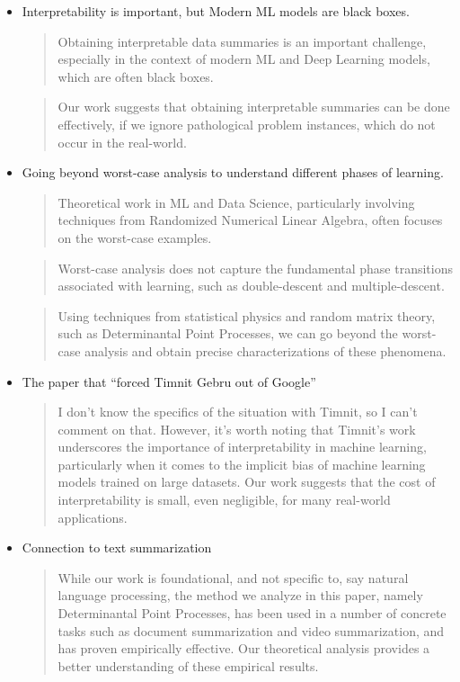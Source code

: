 \documentclass[11pt, oneside]{article}   	%
\begin{document}
\newpage
\begin{itemize}
\item Interpretability is important, but Modern ML models are
  black boxes.
  \begin{quote}
    Obtaining interpretable data summaries is an
    important challenge, especially in the context of modern ML and
    Deep Learning models, which are often black boxes.
  \end{quote}
  \begin{quote}
    Our work suggests that obtaining interpretable summaries can be
    done effectively, if we ignore pathological problem instances,
    which do not occur in the real-world.
  \end{quote}
\item Going beyond worst-case analysis to understand different phases
  of learning.
  \begin{quote}
Theoretical work in ML and Data Science, particularly involving
techniques from Randomized Numerical Linear Algebra, often focuses on
the worst-case examples.
\end{quote}
\begin{quote}
  Worst-case analysis does not capture the
fundamental phase transitions associated with learning, such as
double-descent and multiple-descent.
\end{quote}
\begin{quote}
Using techniques from statistical physics and random matrix theory,
such as Determinantal Point Processes, we can go beyond the worst-case
analysis and obtain precise characterizations of these phenomena.
\end{quote}
\item The paper that “forced Timnit Gebru out of Google”
  \begin{quote}
    I don’t know the specifics of the situation with Timnit, so I
    can’t comment on that. However, it's worth noting that Timnit's work underscores the
    importance of interpretability in machine learning, particularly when
    it comes to the implicit bias of machine learning models trained
    on large datasets. Our work suggests that the cost of interpretability is small, even
    negligible, for many real-world applications.
  \end{quote}
\item Connection to text summarization
  \begin{quote}
    While our work is foundational, and not specific to, say natural
    language processing, the method we analyze in this paper, namely
    Determinantal Point Processes, has been used in a number of
    concrete tasks such as document summarization and video
    summarization, and has proven empirically effective. Our
    theoretical analysis provides a better understanding of these
    empirical results.
  \end{quote}
  \end{itemize}
\vspace{2mm}
\end{document}
